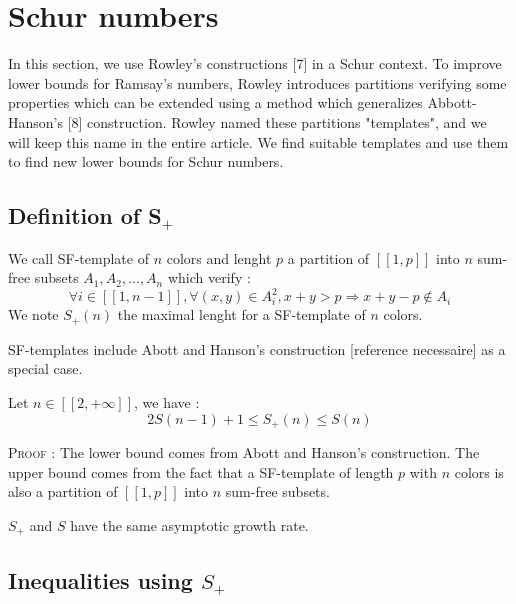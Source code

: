 \section{Schur numbers}

\qquad In this section, we use Rowley's constructions [7] in a Schur context. To improve lower bounds for Ramsay's numbers, Rowley 
introduces partitions verifying some properties which can be extended using a method which generalizes Abbott-Hanson's [8] construction. 
Rowley named these partitions "templates", and we will keep this name in the entire article. We find suitable templates and use them
 to find new lower bounds for Schur numbers.

\subsection{Definition of S\(_+\)}

\begin{definition}
	We call SF-template of \(n\) colors and lenght \(p\) a partition of \( [\![1,p]\!]\) into \(n\) sum-free subsets \(A_1, A_2, ..., A_n\) which verify :
	\[
	\forall i \in [\![1, n-1]\!], \forall (x,y) \in A_i^2, x+y > p
	\Longrightarrow x+y-p \notin A_i
	\]
	We note \(S_+(n)\) the maximal lenght for a SF-template of \(n\) colors. 
\end{definition}

\begin{remark}
	SF-templates include Abott and Hanson's construction [reference necessaire] as a special case.
\end{remark}

\begin{proposition}
	Let \(n \in [\![2, +\infty]\!]\), we have :
	\[
	2S(n-1)+1 \leqslant S_+(n) \leqslant S(n)
	\]
\end{proposition}

\textsc{Proof :} The lower bound comes from Abott and Hanson's construction. The upper bound comes 
from the fact that a SF-template of length \(p\) with \(n\) colors is also a partition of 
\([\![1, p]\!]\) into \(n\) sum-free subsets.

\begin{remark}
	\(S_+\) and \(S\) have the same asymptotic growth rate.
\end{remark}


\subsection{Inequalities using \(S_+\)} 

